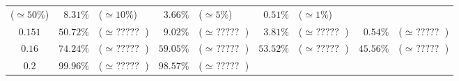 \documentclass[10pt]{report}
\begin{document}
\begin{exercice}
\begin{center}
\begin{tabular}{|c|rl|rl|rl|rl|}
        ($\simeq 50\%$)
         & 
    
        $8.31\%$
         & 
    
        ($\simeq 10\%$)
         & 
    
        $3.66\%$
         & 
    
        ($\simeq 5\%$)
         & 
    
        $0.51\%$
         & 
    
        ($\simeq 1\%$)
        
    \\ 

    
        $0.151$
         & 
    
        $50.72\%$
         & 
    
        ($\simeq \mbox{ ????? }$)
         & 
    
        $9.02\%$
         & 
    
        ($\simeq \mbox{ ????? }$)
         & 
    
        $3.81\%$
         & 
    
        ($\simeq \mbox{ ????? }$)
         & 
    
        $0.54\%$
         & 
    
        ($\simeq \mbox{ ????? }$)
        
    \\ 

    
        $0.16$
         & 
    
        $74.24\%$
         & 
    
        ($\simeq \mbox{ ????? }$)
         & 
    
        $59.05\%$
         & 
    
        ($\simeq \mbox{ ????? }$)
         & 
    
        $53.52\%$
         & 
    
        ($\simeq \mbox{ ????? }$)
         & 
    
        $45.56\%$
         & 
    
        ($\simeq \mbox{ ????? }$)
        
    \\ 

    
        $0.2$
         & 
    
        $99.96\%$
         & 
    
        ($\simeq \mbox{ ????? }$)
         & 
    
        $98.57\%$
         & 
    
        ($\simeq \mbox{ ????? }$)
         & 
    

\end{tabular}
\end{center}
\end{exercice}
\end{document}
